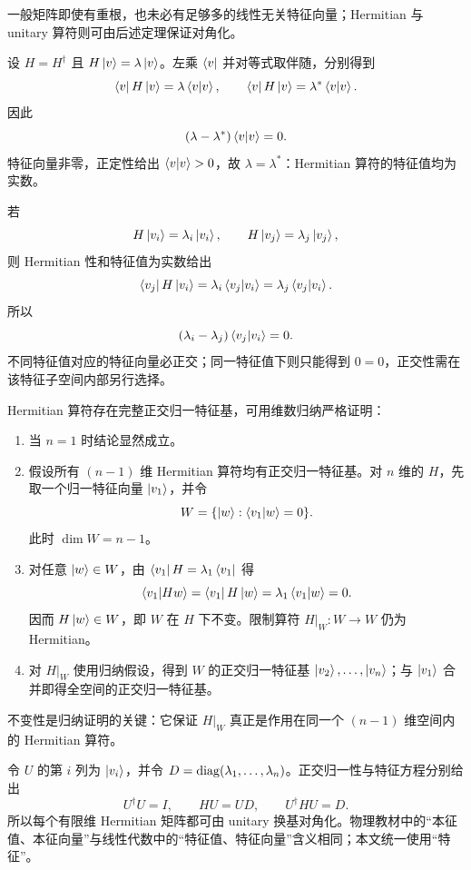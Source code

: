 一般矩阵即使有重根，也未必有足够多的线性无关特征向量；Hermitian 与 unitary 算符则可由后述定理保证对角化。


设 $H=H^\dagger$ 且 $H\left|v\right\rangle=\lambda\left|v\right\rangle$。左乘 $\left\langle v\right|$ 并对等式取伴随，分别得到
\[
  \left\langle v\right|H\left|v\right\rangle=\lambda\left\langle v \middle| v \right\rangle,
  \qquad
  \left\langle v\right|H\left|v\right\rangle=\lambda^*\left\langle v \middle| v \right\rangle.
\]
因此
\begin{equation}
  (\lambda-\lambda^*)\left\langle v \middle| v \right\rangle=0.
  \label{eq:QM-C01-S08-hermitian-real}
\end{equation}
特征向量非零，正定性给出 $\left\langle v \middle| v \right\rangle>0$，故 $\lambda=\lambda^*$：Hermitian 算符的特征值均为实数。

若
\[
  H\left|v_i\right\rangle=\lambda_i\left|v_i\right\rangle,
  \qquad
  H\left|v_j\right\rangle=\lambda_j\left|v_j\right\rangle,
\]
则 Hermitian 性和特征值为实数给出
\[
  \left\langle v_j\right|H\left|v_i\right\rangle
  =\lambda_i\left\langle v_j \middle| v_i \right\rangle
  =\lambda_j\left\langle v_j \middle| v_i \right\rangle.
\]
所以
\begin{equation}
  (\lambda_i-\lambda_j)\left\langle v_j \middle| v_i \right\rangle=0.
  \label{eq:QM-C01-S08-hermitian-orthogonality}
\end{equation}
不同特征值对应的特征向量必正交；同一特征值下则只能得到 $0=0$，正交性需在该特征子空间内部另行选择。

Hermitian 算符存在完整正交归一特征基，可用维数归纳严格证明：
\begin{enumerate}
  \item 当 $n=1$ 时结论显然成立。
  \item 假设所有 $(n-1)$ 维 Hermitian 算符均有正交归一特征基。对 $n$ 维的 $H$，先取一个归一特征向量 $\left|v_1\right\rangle$，并令
  \[
    W=\{\left|w\right\rangle:\left\langle v_1 \middle| w \right\rangle=0\}.
  \]
  此时 $\dim W=n-1$。
  \item 对任意 $\left|w\right\rangle\in W$，由 $\left\langle v_1\right|H=\lambda_1\left\langle v_1\right|$ 得
  \[
    \left\langle v_1 \middle| Hw \right\rangle
    =\left\langle v_1\right|H\left|w\right\rangle
    =\lambda_1\left\langle v_1 \middle| w \right\rangle=0.
  \]
  因而 $H\left|w\right\rangle\in W$，即 $W$ 在 $H$ 下不变。限制算符 $H|_W:W\to W$ 仍为 Hermitian。
  \item 对 $H|_W$ 使用归纳假设，得到 $W$ 的正交归一特征基 $\left|v_2\right\rangle,\ldots,\left|v_n\right\rangle$；与 $\left|v_1\right\rangle$ 合并即得全空间的正交归一特征基。
\end{enumerate}
不变性是归纳证明的关键：它保证 $H|_W$ 真正是作用在同一个 $(n-1)$ 维空间内的 Hermitian 算符。

令 $U$ 的第 $i$ 列为 $\left|v_i\right\rangle$，并令 $D=\operatorname{diag}(\lambda_1,\ldots,\lambda_n)$。正交归一性与特征方程分别给出
\begin{equation}
  U^\dagger U=I,
  \qquad
  HU=UD,
  \qquad
  U^\dagger HU=D.
  \label{eq:QM-C01-S08-hermitian-diagonalization}
\end{equation}
所以每个有限维 Hermitian 矩阵都可由 unitary 换基对角化。物理教材中的“本征值、本征向量”与线性代数中的“特征值、特征向量”含义相同；本文统一使用“特征”。

